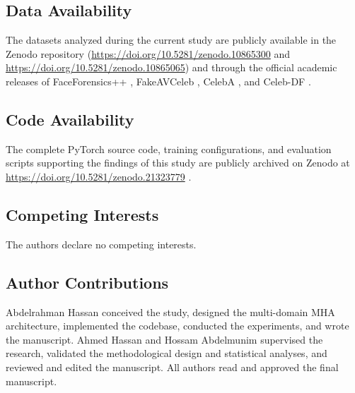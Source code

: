 \documentclass[fleqn,10pt]{wlscirep}
\begin{document}
\subsection*{Data Availability}
The datasets analyzed during the current study are publicly available in the Zenodo repository (\url{https://doi.org/10.5281/zenodo.10865300} and \url{https://doi.org/10.5281/zenodo.10865065}) and through the official academic releases of FaceForensics++ \cite{ref12}, FakeAVCeleb \cite{ref11}, CelebA \cite{ref36}, and Celeb-DF \cite{ref37}.

\subsection*{Code Availability}
The complete PyTorch source code, training configurations, and evaluation scripts supporting the findings of this study are publicly archived on Zenodo at \url{https://doi.org/10.5281/zenodo.21323779} \cite{ref26}.

\subsection*{Competing Interests}
The authors declare no competing interests.

\subsection*{Author Contributions}
Abdelrahman Hassan conceived the study, designed the multi-domain MHA architecture, implemented the codebase, conducted the experiments, and wrote the manuscript. Ahmed Hassan and Hossam Abdelmunim supervised the research, validated the methodological design and statistical analyses, and reviewed and edited the manuscript. All authors read and approved the final manuscript.
\end{document}
